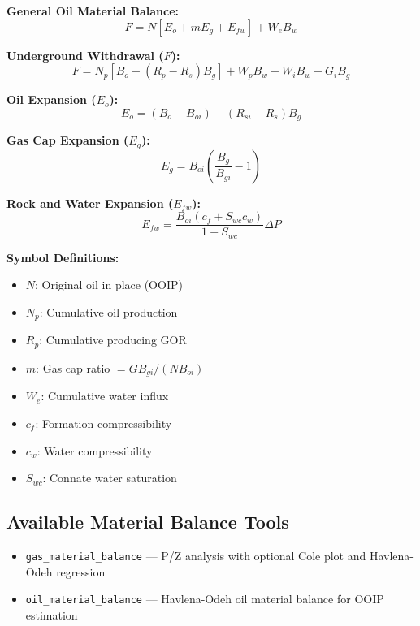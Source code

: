 \documentclass[11pt,a4paper]{article}
\newcommand{\symitem}[2]{\item \textbf{#1}: #2}
\begin{document}
\begin{tcolorbox}[colback=formulabox,colframe=black!75]
\textbf{General Oil Material Balance:}
\begin{equation}
F = N [E_o + m E_g + E_{fw}] + W_e B_w
\end{equation}

\textbf{Underground Withdrawal ($F$):}
\begin{equation}
F = N_p [B_o + (R_p - R_s) B_g] + W_p B_w - W_i B_w - G_i B_g
\end{equation}

\textbf{Oil Expansion ($E_o$):}
\begin{equation}
E_o = (B_o - B_{oi}) + (R_{si} - R_s) B_g
\end{equation}

\textbf{Gas Cap Expansion ($E_g$):}
\begin{equation}
E_g = B_{oi} \left(\frac{B_g}{B_{gi}} - 1\right)
\end{equation}

\textbf{Rock and Water Expansion ($E_{fw}$):}
\begin{equation}
E_{fw} = \frac{B_{oi} (c_f + S_{wc} c_w)}{1 - S_{wc}} \Delta P
\end{equation}
\end{tcolorbox}

\textbf{Symbol Definitions:}
\begin{itemize}[leftmargin=2cm]
\symitem{$N$}{Original oil in place (OOIP)}
\symitem{$N_p$}{Cumulative oil production}
\symitem{$R_p$}{Cumulative producing GOR}
\symitem{$m$}{Gas cap ratio $= G B_{gi} / (N B_{oi})$}
\symitem{$W_e$}{Cumulative water influx}
\symitem{$c_f$}{Formation compressibility}
\symitem{$c_w$}{Water compressibility}
\symitem{$S_{wc}$}{Connate water saturation}
\end{itemize}

\subsection{Available Material Balance Tools}
\begin{itemize}
\item \texttt{gas\_material\_balance} --- P/Z analysis with optional Cole plot and Havlena-Odeh regression
\item \texttt{oil\_material\_balance} --- Havlena-Odeh oil material balance for OOIP estimation
\end{itemize}

\newpage
\end{document}
